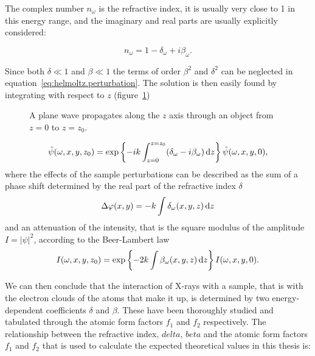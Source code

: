 The complex number $n_\omega$ is the refractive index, it is usually
very close to 1 in this energy range, and the imaginary and real parts are
usually explicitly considered:

\begin{equation*}
    n_\omega = 1 - \delta_\omega + i\beta_\omega.
\end{equation*}

Since both $\delta \ll 1$ and $\beta \ll 1$ the terms of order $\beta^2$ and
$\delta^2$ can be neglected in equation~\eqref{eq:helmoltz.perturbation}.
The solution is then easily found by integrating with respect to $z$
(figure~\ref{fig:propagation})

\begin{figure}[htb]
    \centering
    
    \caption[Plane wave propagation.]{A plane wave propagates along the $z$
        axis through an object from $z = 0$ to $z = z_0$.}
    \label{fig:propagation}
\end{figure}

\begin{equation}
    \tilde{\psi}(\omega, x, y, z_0) = \exp\left\{-ik\int_{z=0}^{z=z_0}(\delta_\omega - i
\beta_\omega) \operatorname{d}\!{z} \right\} \tilde{\psi}(\omega, x, y, 0),
\label{eq:helmoltz.solution}
\end{equation}
where the effects of the sample perturbations can be described as the sum of
a phase shift determined by the real part of the refractive index $\delta$
\begin{equation}
    \Delta\varphi(x, y) = -k \int \delta_\omega(x, y, z) \operatorname{d}\!{z}
    \label{eq:phase.deviation}
\end{equation}
and an attenuation of the intensity, that is the square modulus of the
amplitude $I = |\psi|^2$, according to the Beer-Lambert law
\begin{equation}
    I(\omega, x, y, z_0) = \exp\left\{-2k\int \beta_\omega(x, y, z) \operatorname{d}\!{z}\right\}
    I(\omega, x, y, 0).\label{eq:beer-lambert}
\end{equation}

We can then conclude that the interaction of X-rays with a sample, that is
with the electron clouds of the atoms that make it up, is determined by
two energy-dependent coefficients $\delta$ and $\beta$. These have been
thoroughly studied and tabulated through the atomic form
factors $f_1$ and $f_2$ respectively. The relationship between the
refractive index, $delta$, $beta$ and the atomic form factors $f_1$ and
$f_2$ that is used to calculate the expected theoretical values in this
thesis is:

